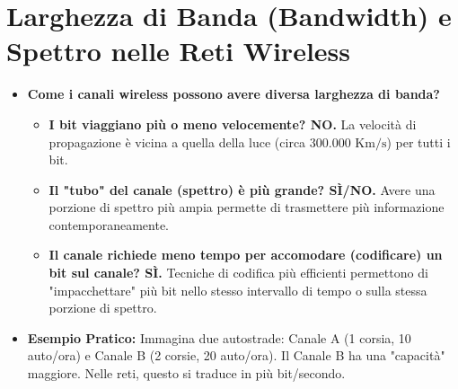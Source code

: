 \section{Larghezza di Banda (Bandwidth) e Spettro nelle Reti Wireless}

\begin{itemize}
    \item \textbf{Come i canali wireless possono avere diversa larghezza di banda?}
    \begin{itemize}
        \item \textbf{I bit viaggiano più o meno velocemente? NO.} La velocità di propagazione è vicina a quella della luce (circa $300.000 \text{ Km/s}$) per tutti i bit.
        \item \textbf{Il "tubo" del canale (spettro) è più grande? SÌ/NO.} Avere una porzione di spettro più ampia permette di trasmettere più informazione contemporaneamente.
        \item \textbf{Il canale richiede meno tempo per accomodare (codificare) un bit sul canale? SÌ.} Tecniche di codifica più efficienti permettono di "impacchettare" più bit nello stesso intervallo di tempo o sulla stessa porzione di spettro.
    \end{itemize}
    \item \textbf{Esempio Pratico:}
    Immagina due autostrade: Canale A (1 corsia, 10 auto/ora) e Canale B (2 corsie, 20 auto/ora). Il Canale B ha una "capacità" maggiore. Nelle reti, questo si traduce in più bit/secondo.
\end{itemize}

